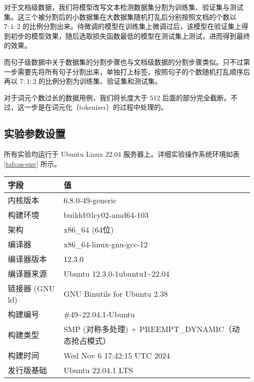 对于文档级数据，我们将模型改写文本检测数据集分割为训练集、验证集与测试集。这三个被分割后的小数据集在大数据集随机打乱后分别按照文档的个数以 $7:1:2$ 的比例分割出来。待微调的模型在训练集上微调过后，该模型在验证集上得到初步的模型效果，随后选取损失函数最低的模型在测试集上测试，进而得到最终的效果。

而句子级数据中关于数据集的分割步骤也与文档级数据的分割步骤类似。只不过第一步需要先将所有句子分割出来，单独打上标签，按照句子的个数随机打乱顺序后再以 $7:1:2$ 的比例分割为训练集、验证集和测试集。

对于词元个数过长的数据用例，我们将长度大于 512 后面的部分完全截断。不过，这一步是在词元化（tokenizer）的过程中处理的。

\subsection{实验参数设置}
\label{sec:method-experiment-parameter}

所有实验均运行于 Ubuntu Linux 22.04 服务器上。详细实验操作系统环境如表 \ref{tab:os-env} 所示。

\begin{table*}[htbp]
\centering
\caption{实验操作系统环境} \label{tab:os-env}
\begin{tabular}{ll}
\toprule
\textbf{字段}    & \textbf{值}                               \\ \midrule
内核版本           & 6.8.0-49-generic                         \\
构建环境           & buildd@lcy02-amd64-103                   \\
架构             & x86\_64 (64位)                             \\
编译器            & x86\_64-linux-gnu-gcc-12                  \\
编译器版本          & 12.3.0                                   \\
编译器来源          & Ubuntu 12.3.0-1ubuntu1\textasciitilde22.04             \\
链接器   (GNU ld) & GNU Binutils for Ubuntu 2.38             \\
构建编号           & \#49\textasciitilde22.04.1-Ubuntu                       \\
构建类型           & SMP (对称多处理) + PREEMPT\_DYNAMIC（动态抢占模式） \\
构建时间           & Wed Nov 6 17:42:15 UTC 2024              \\
发行版基础          & Ubuntu 22.04.1 LTS                       \\ \bottomrule
\end{tabular}
\end{table*}

